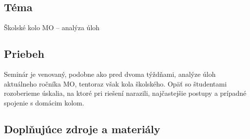 
\subsection*{Téma}
Školské kolo MO -- analýza úloh

\subsection*{Priebeh}

Seminár je venovaný, podobne ako pred dvoma týždňami, analýze úloh aktuálneho ročníka MO, tentoraz však kola školského. Opäť so študentami rozoberieme úskalia, na ktoré pri riešení narazili, najčastejšie postupy a prípadné spojenie s domácim kolom.

\subsection*{Doplňujúce zdroje a materiály}
